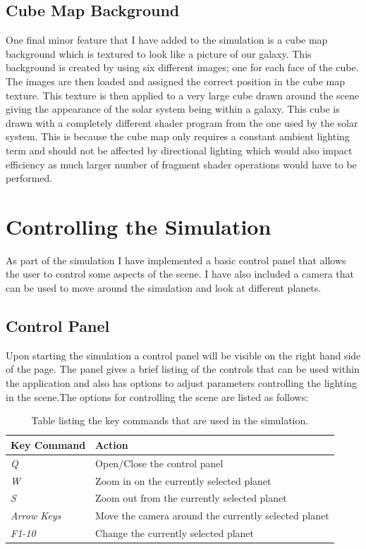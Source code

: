 \documentclass[paper=a4, fontsize=11pt]{scrartcl}	%
\numberwithin{equation}{section}															%
\numberwithin{figure}{section}																%
\numberwithin{table}{section}																%
\begin{document}
\subsection{Cube Map Background}
One final minor feature that I have added to the simulation is a cube map background which is textured to look like a picture of our galaxy. This background is created by using six different images; one for each face of the cube. The images are then loaded and assigned the correct position in the cube map texture. This texture is then applied to a very large cube drawn around the scene giving the appearance of the solar system being within a galaxy. This cube is drawn with a completely different shader program from the one used by the solar system. This is because the cube map only requires a constant ambient lighting term and should not be affected by directional lighting which would also impact efficiency as much larger number of fragment shader operations would have to be performed.

\section{Controlling the Simulation}
\label{sec:controlling-the-simulation}
As part of the simulation I have implemented a basic control panel that allows the user to control some aspects of the scene. I have also included a camera that can be used to move around the simulation and look at different planets.

\subsection{Control Panel}
Upon starting the simulation a control panel will be visible on the right hand side of the page. The panel gives a brief listing of the controls that can be used within the application and also has options to adjust parameters controlling the lighting in the scene.The options for controlling the scene are listed as follows:

\begin{table}[H]
\centering
\begin{tabular}{ l p{12cm}}
Key Command & Action \\ \hline
\textit{Q} & Open/Close the control panel \\ \hline
\textit{W} & Zoom in on the currently selected planet \\ \hline
\textit{S} & Zoom out from the currently selected planet \\ \hline
\textit{Arrow Keys} & Move the camera around the currently selected planet \\ \hline
\textit{F1-10} & Change the currently selected planet \\ \hline

\end{tabular}
\caption{Table listing the key commands that are used in the simulation.}
\label{table:keyboard-controls}
\end{table}
\end{document}
